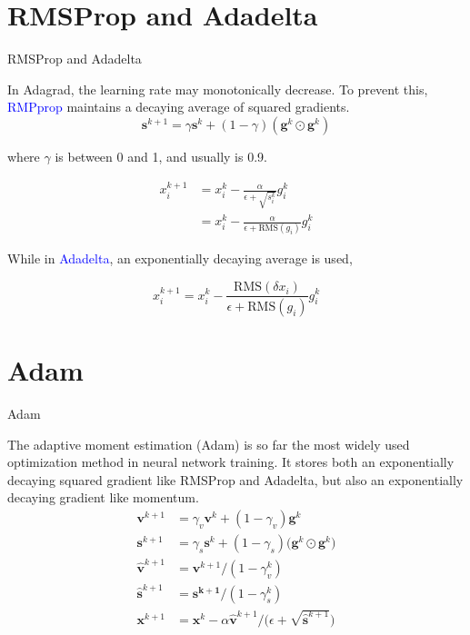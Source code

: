 \documentclass{beamer}
\begin{document}
\section{RMSProp and Adadelta}
\begin{frame}{RMSProp and Adadelta}

In Adagrad, the learning rate may monotonically decrease. To prevent this, \textcolor{blue}{RMPprop} maintains a decaying average of squared gradients.
\begin{equation*}
    \boldsymbol{s}^{k+1} = \gamma \boldsymbol{s}^k + (1-\gamma)(\boldsymbol{g}^k \odot \boldsymbol{g}^k)
\end{equation*}

where $\gamma$ is between 0 and 1, and usually is 0.9.

\begin{equation*}
\begin{split}
    x_i^{k+1} &= x_i^k - \frac{\alpha}{\epsilon + \sqrt{s_i^k}} g_i^k \\
              &= x_i^k - \frac{\alpha}{\epsilon + \textrm{RMS}(g_i)} g_i^k        
\end{split}
\end{equation*}

While in \textcolor{blue}{Adadelta}, an exponentially decaying average is used,

\begin{equation*}
    x_i^{k+1} = x_i^k - \frac{\textrm{RMS}(\delta x_i)}{\epsilon + \textrm{RMS}(g_i)} g_i^k        
\end{equation*}

\end{frame}

\section{Adam}
\begin{frame}{Adam}

The adaptive moment estimation (Adam) is so far the most widely used optimization method in neural network training.
It stores both an exponentially decaying squared gradient like RMSProp and Adadelta, but also an exponentially decaying gradient like momentum.
\begin{equation*}
 \begin{split}
    \boldsymbol{v}^{k+1} &= \gamma_v \boldsymbol{v}^k + (1-\gamma_v) \boldsymbol{g}^k \\
    \boldsymbol{s}^{k+1} &= \gamma_s \boldsymbol{s}^k + (1-\gamma_s) \bigg(\boldsymbol{g}^k \odot \boldsymbol{g}^k \bigg)\\
    \hat{\boldsymbol{v}}^{k+1} &= \boldsymbol{v}^{k+1}/(1-\gamma_v^k)\\
    \hat{\boldsymbol{s}}^{k+1} &= \boldsymbol{s^{k+1}}/(1-\gamma_s^k)\\
    \boldsymbol{x}^{k+1} &= \boldsymbol{x}^k - \alpha \hat{\boldsymbol{v}}^{k+1}/\bigg(\epsilon + \sqrt{\hat{\boldsymbol{s}}^{k+1}}\bigg)
 \end{split}
\end{equation*}


\end{frame}
\end{document}
